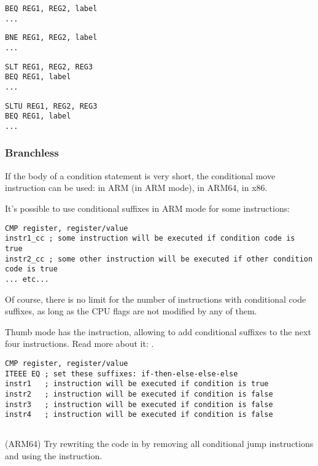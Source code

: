 \begin{lstlisting}[caption=Check for equal values]
BEQ REG1, REG2, label
...
\end{lstlisting}

\begin{lstlisting}[caption=Check for non-equal values]
BNE REG1, REG2, label
...
\end{lstlisting}

\begin{lstlisting}[caption=Check for less than{,} greater than (signed)]
SLT REG1, REG2, REG3
BEQ REG1, label
...
\end{lstlisting}

\begin{lstlisting}[caption=Check for less than{,} greater than (unsigned)]
SLTU REG1, REG2, REG3
BEQ REG1, label
...
\end{lstlisting}

\subsubsection{Branchless}

If the body of a condition statement is very short, the conditional move instruction can be used: 
 in ARM (in ARM mode),  in ARM64,  in x86.


It's possible to use conditional suffixes in ARM mode for some instructions:

\begin{lstlisting}[caption=ARM (\ARMMode)]
CMP register, register/value
instr1_cc ; some instruction will be executed if condition code is true
instr2_cc ; some other instruction will be executed if other condition code is true
... etc...
\end{lstlisting}

Of course, there is no limit for the number of instructions with conditional code suffixes, 
as long as the CPU flags are not modified by any of them.


Thumb mode has the  instruction, allowing to add conditional suffixes to the next four instructions.
Read more about it: .

\begin{lstlisting}[caption=ARM (\ThumbMode)]
CMP register, register/value
ITEEE EQ ; set these suffixes: if-then-else-else-else
instr1   ; instruction will be executed if condition is true
instr2   ; instruction will be executed if condition is false
instr3   ; instruction will be executed if condition is false
instr4   ; instruction will be executed if condition is false
\end{lstlisting}

\subsection{\Exercise}

(ARM64) Try rewriting the code in  by removing all 
conditional jump instructions and using the  instruction.

